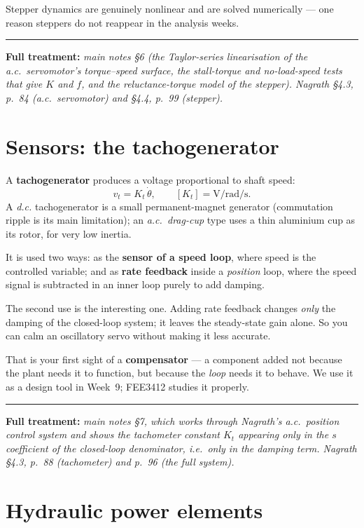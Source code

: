 \documentclass[11pt,a4paper]{article}
\newcommand{\fullmath}[1]{%
  \par\smallskip\noindent
  \textcolor{fnavy}{\rule{\textwidth}{0.4pt}}\par\vspace{-4pt}
  {\small\textcolor{fnavy}{\textbf{Full treatment:}} \textit{#1}}\par\smallskip}
\begin{document}
Stepper dynamics are genuinely nonlinear and are solved numerically --- one
reason steppers do not reappear in the analysis weeks.

\fullmath{main notes \S6 (the Taylor-series linearisation of the a.c.\ servomotor's torque--speed surface, the stall-torque and no-load-speed tests that give $K$ and $f$, and the reluctance-torque model of the stepper). Nagrath \S4.3, p.~84 (a.c.\ servomotor) and \S4.4, p.~99 (stepper).}

\section{Sensors: the tachogenerator}

A \textbf{tachogenerator} produces a voltage proportional to shaft speed:
\[
  v_{t}=K_{t}\,\dot\theta,\qquad
  [K_{t}]=\si{\volt\per\radian\per\second}.
\]
A \emph{d.c.} tachogenerator is a small permanent-magnet generator (commutation
ripple is its main limitation); an \emph{a.c.\ drag-cup} type uses a thin
aluminium cup as its rotor, for very low inertia.

It is used two ways: as the \textbf{sensor of a speed loop}, where speed is the
controlled variable; and as \textbf{rate feedback} inside a \emph{position}
loop, where the speed signal is subtracted in an inner loop purely to add
damping.

\begin{keyidea}
The second use is the interesting one. Adding rate feedback changes
\emph{only} the damping of the closed-loop system; it leaves the steady-state
gain alone. So you can calm an oscillatory servo without making it less
accurate.

That is your first sight of a \textbf{compensator} --- a component added not
because the plant needs it to function, but because the \emph{loop} needs it to
behave. We use it as a design tool in Week~9; FEE3412 studies it properly.
\end{keyidea}

\fullmath{main notes \S7, which works through Nagrath's a.c.\ position control system and shows the tachometer constant $K_{t}$ appearing only in the $s$ coefficient of the closed-loop denominator, i.e.\ only in the damping term. Nagrath \S4.3, p.~88 (tachometer) and p.~96 (the full system).}

\section{Hydraulic power elements}
\end{document}
